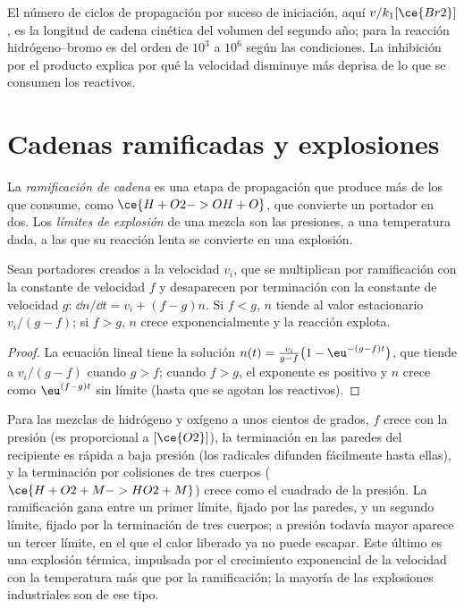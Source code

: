 El número de ciclos de propagación por suceso de iniciación, aquí $v/k_1[\ce{Br2}]$, es la
longitud de cadena cinética del volumen del segundo año; para la reacción hidrógeno--bromo
es del orden de $10^3$ a $10^6$ según las condiciones. La inhibición por
el producto explica por qué la velocidad disminuye más deprisa de lo que se consumen los reactivos.

\section{Cadenas ramificadas y explosiones}

\begin{definition}\label{def:b3:complex-kinetics:branching}
La \emph{ramificación de cadena} es una etapa de propagación que produce
más  de los que consume, como $\ce{H + O2 -> OH + O}$, que convierte un
portador en dos. Los \emph{límites de explosión} de una mezcla
son las presiones, a una temperatura dada, a las que su reacción lenta se convierte
en una explosión.
\end{definition}

\begin{proposition}\label{prop:b3:complex-kinetics:branching}
Sean portadores creados a la velocidad $v_i$, que se multiplican por ramificación con la constante
de velocidad $f$ y desaparecen por terminación con la constante de velocidad $g$:
$\dd n/\dd t = v_i + (f - g)n$. Si $f < g$, $n$ tiende al valor estacionario $v_i/(g - f)$; si
$f > g$, $n$ crece exponencialmente y la reacción explota.
\end{proposition}

\begin{proof}
La ecuación lineal tiene la solución $n(t) = \frac{v_i}{g - f}\bigl(1 - \eu^{-(g - f)t}\bigr)$, que
tiende a $v_i/(g - f)$ cuando $g > f$; cuando $f > g$, el exponente es positivo y $n$
crece como $\eu^{(f - g)t}$ sin límite (hasta que se agotan los reactivos).
\end{proof}

Para las mezclas de hidrógeno y oxígeno a unos cientos de grados, $f$ crece con la
presión (es proporcional a $[\ce{O2}]$), la terminación en las paredes del
recipiente es rápida a baja presión (los radicales difunden fácilmente hasta ellas), y la
terminación por colisiones de tres cuerpos ($\ce{H + O2 + M -> HO2 + M}$) crece como el cuadrado
de la presión. La ramificación gana entre un primer límite, fijado por las paredes, y un
segundo límite, fijado por la terminación de tres cuerpos; a presión todavía mayor aparece un tercer
límite, en el que el calor liberado ya no puede escapar. Este último es una
explosión térmica, impulsada por el crecimiento exponencial de la velocidad con la
temperatura más que por la ramificación; la mayoría de las explosiones industriales son de ese
tipo.


